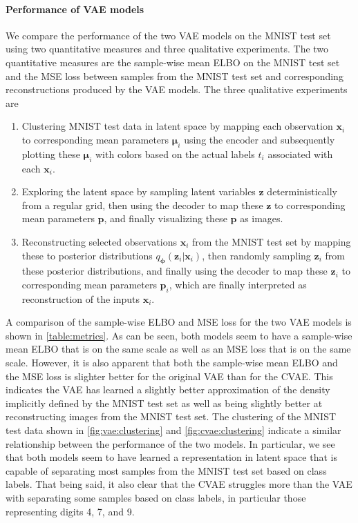 \paragraph{Performance of VAE models}
We compare the performance of the two VAE models on the MNIST test set using two quantitative measures and three qualitative experiments. The two quantitative measures are the sample-wise mean ELBO on the MNIST test set and the MSE loss between samples from the MNIST test set and corresponding reconstructions produced by the VAE models. The three qualitative experiments are
\begin{enumerate}
    \item Clustering MNIST test data in latent space by mapping each observation $\mathbf{x}_i$ to corresponding mean parameters $\bm{\mu}_i$ using the encoder and subsequently plotting these $\bm{\mu}_i$ with colors based on the actual labels $t_i$ associated with each $\mathbf{x}_i$.
    \item Exploring the latent space by sampling latent variables $\mathbf{z}$ deterministically from a regular grid, then using the decoder to map these $\mathbf{z}$ to corresponding mean parameters $\mathbf{p}$,  and finally visualizing these $\mathbf{p}$ as images.
    \item Reconstructing selected observations $\mathbf{x}_i$ from the MNIST test set by mapping these to posterior distributions $q_{\bm{\phi}}(\mathbf{z}_i|\mathbf{x}_i)$, then randomly sampling $\mathbf{z}_i$ from these posterior distributions, and finally using the decoder to map these $\mathbf{z}_i$ to corresponding mean parameters $\mathbf{p}_i$, which are finally interpreted as reconstruction of the inputs $\mathbf{x}_i$.
\end{enumerate}
A comparison of the sample-wise ELBO and MSE loss for the two VAE models is shown in \cref{table:metrics}. As can be seen, both models seem to have a sample-wise mean ELBO that is on the same scale as well as an MSE loss that is on the same scale. However, it is also apparent that both the sample-wise mean ELBO and the MSE loss is slighter better for the original VAE than for the CVAE\@. This indicates the VAE has learned a slightly better approximation of the density implicitly defined by the MNIST test set as well as being slightly better at reconstructing images from the MNIST test set. The clustering of the MNIST test data shown in \cref{fig:vae:clustering} and \cref{fig:cvae:clustering} indicate a similar relationship between the performance of the two models. In particular, we see that both models seem to have learned a representation in latent space that is capable of separating most samples from the MNIST test set based on class labels. That being said, it also clear that the CVAE struggles more than the VAE with separating some samples based on class labels, in particular those representing digits 4, 7, and 9. 

